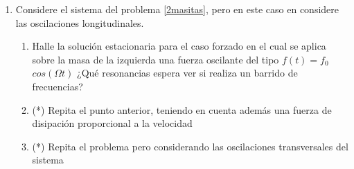 \documentclass[11pt,spanish,a4paper]{article}
\begin{document}
\begin{enumerate}
\item Considere el sistema del problema \ref{2masitas}, pero en este caso en considere las oscilaciones longitudinales.
\begin{enumerate}
    \item Halle la solución estacionaria para el caso forzado en el cual se aplica sobre la masa de la izquierda una fuerza oscilante del tipo $f(t)=f_0$ $cos(\Omega t)$ ¿Qué resonancias espera ver si realiza un barrido de frecuencias?
		\item (*) Repita el punto anterior, teniendo en cuenta además una fuerza de disipación proporcional a la velocidad
		\item (*) Repita el problema pero considerando las oscilaciones transversales del sistema
\end{enumerate}


\end{enumerate}
\end{document}
